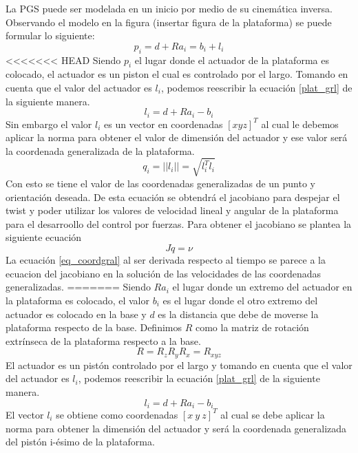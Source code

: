 La PGS puede ser modelada en un inicio por medio de su cinemática inversa. Observando el modelo en la figura (insertar figura de la plataforma) se puede formular lo siguiente:
\begin{equation} \label{plat_grl}
p_i = d + Ra_i = b_i + l_i
\end{equation}
<<<<<<< HEAD
Siendo $p_i$ el lugar donde el actuador de la plataforma es colocado, el actuador es un piston el cual es controlado por el largo. Tomando en cuenta que el valor del actuador es $l_i$, podemos reescribir la ecuación \ref{plat_grl} de la siguiente manera.
\begin{equation}
l_i = d + Ra_i - b_i
\end{equation}
Sin embargo el valor $l_i$ es un vector en coordenadas $[x y z]^T$ al cual le debemos aplicar la norma para obtener el valor de dimensión del actuador y ese valor será la coordenada generalizada de la plataforma.
\begin{equation}\label{eq_coordgral}
q_i = ||l_i|| = \sqrt{l_i^Tl_i}
\end{equation}
Con esto se tiene el valor de las coordenadas generalizadas de un punto y orientación deseada. De esta ecuación se obtendrá el jacobiano para despejar el twist y poder utilizar los valores de velocidad lineal y angular de la plataforma para el desarroollo del control por fuerzas. Para obtener el jacobiano se plantea la siguiente ecuación
\begin{equation} \label{equgral_q}
J\dot{q}=\nu
\end{equation}
La ecuación \ref{eq_coordgral} al ser derivada respecto al tiempo se parece a la ecuacion del jacobiano en la solución de las velocidades de las coordenadas generalizadas.
=======
Siendo $Ra_i$ el lugar donde un extremo del actuador en la plataforma es colocado, el valor $b_i$ es el lugar donde el otro extremo del actuador es colocado en la base y $d$ es la distancia que debe de moverse la plataforma respecto de la base. Definimos $R$ como la matriz de rotación extrínseca de la plataforma respecto a la base. 
\begin{equation}
R = R_zR_yR_x = R_{xyz}
\end{equation}
El actuador es un pistón controlado por el largo y tomando en cuenta que el valor del actuador es $l_i$, podemos reescribir la ecuación \ref{plat_grl} de la siguiente manera.
\begin{equation}
l_i = d + Ra_i - b_i
\end{equation}
El vector $l_i$ se obtiene como coordenadas $[x\ y\ z]^T$ al cual se debe aplicar la norma para obtener la dimensión del actuador y será la coordenada generalizada del pistón i-ésimo de la plataforma.
